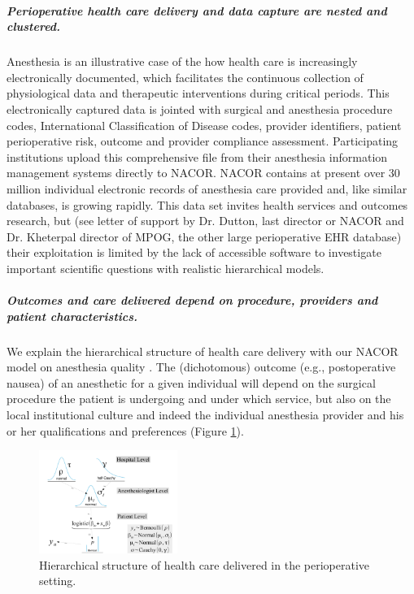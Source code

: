 \documentclass[11pt,notitlepage]{article}
\begin{document}
\subparagraph*{Perioperative health care delivery and data capture are nested and clustered.}
Anesthesia is an illustrative case of the how health care is increasingly 
electronically documented, which facilitates the continuous collection of 
physiological data and therapeutic interventions during critical periods. 
This electronically captured data 
is jointed with surgical and anesthesia procedure codes, International 
Classification of Disease codes, provider identifiers, patient perioperative 
risk, outcome and provider compliance assessment. Participating institutions upload 
this comprehensive file from their anesthesia information management systems
directly to NACOR. NACOR contains at present over 30 million individual 
electronic records of anesthesia care provided and, like similar databases, is 
growing rapidly. This data set invites health services and outcomes research, 
but (see letter of support by Dr. Dutton, last director or 
NACOR and Dr. Kheterpal director of MPOG, the other large perioperative EHR 
database) their exploitation is limited by the lack of accessible software to investigate 
important scientific questions with realistic hierarchical models.

\subparagraph*{Outcomes and care delivered depend on procedure, providers and patient characteristics.} 
We explain the hierarchical structure of health care delivery with our NACOR model on anesthesia quality \cite{AndreaeWhite2015}. 
The (dichotomous) outcome (e.g., postoperative nausea) of 
an anesthetic for a given individual will depend on the surgical procedure the patient is undergoing and under 
which service, but also on the local institutional culture and indeed the individual anesthesia provider and 
his or her qualifications and preferences (Figure \ref{fig:NACOR}). 

\begin{figure} 
\vspace*{-12pt}
\includegraphics[width=0.4\textwidth]{Figures/DistrogramNACOR.pdf} 
\caption{Hierarchical structure of health care delivered in the perioperative setting.}
\label{fig:NACOR}
\vspace*{-12pt}
\end{figure} 
\end{document}
